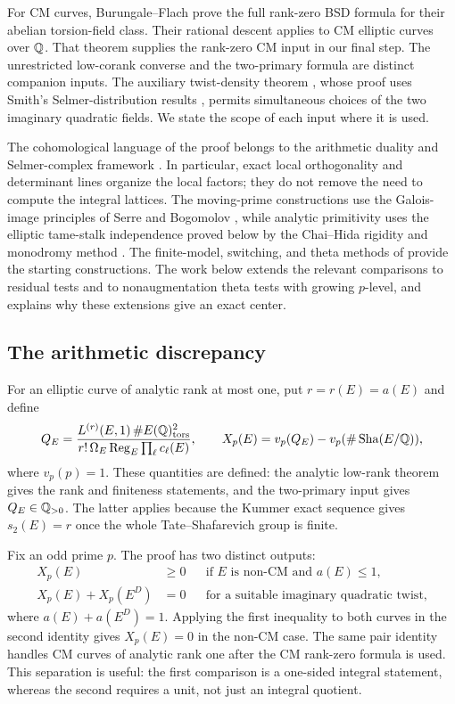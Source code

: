 For CM curves, Burungale--Flach \cite{BurungaleFlach} prove the full
rank-zero BSD formula for their abelian torsion-field class.
Their rational descent applies to CM elliptic curves over \(\mathbb Q\).
That theorem supplies the rank-zero CM input in our final step.
The unrestricted low-corank converse \cite{C} and the two-primary
formula \cite{B} are distinct companion inputs. The auxiliary
twist-density theorem \cite{Goldfeld}, whose proof uses Smith's
Selmer-distribution results \cite{Smith}, permits simultaneous
choices of the two imaginary quadratic fields. We state the
scope of each input where it is used.

The cohomological language of the proof belongs to the arithmetic
duality and Selmer-complex framework
\cite{BlochKato,Milne,Nekovar}. In particular, exact local
orthogonality and determinant lines organize the local factors;
they do not remove the need to compute the integral lattices.
The moving-prime constructions use the Galois-image principles
of Serre and Bogomolov \cite{Serre,Bogomolov}, while analytic
primitivity uses the elliptic tame-stalk independence proved below
by the Chai--Hida rigidity and monodromy method
\cite{ChaiOrd,HidaMu}. The finite-model, switching, and theta
methods of \cite{B,C} provide the starting constructions.
The work below extends the relevant comparisons to residual
tests and to nonaugmentation theta tests with growing \(p\)-level,
and explains why these extensions give an exact center.

\subsection{The arithmetic discrepancy}

For an elliptic curve of analytic rank at most one, put
$r=r(E)=a(E)$ and define
\begin{equation}\label{eq:normalized-quotient}
 Q_E=\frac{L^{(r)}(E,1)\,\#E(\mathbb Q)_{\rm tors}^{2}}
            {r!\,\Omega_E\operatorname{Reg}_E\prod_\ell c_\ell(E)},
 \qquad
 X_p(E)=v_p(Q_E)-v_p(\#\operatorname{Sha}(E/\mathbb Q)),
\end{equation}
where $v_p(p)=1$. These quantities are defined: the analytic low-rank
theorem gives the rank and finiteness statements, and the two-primary
input gives $Q_E\in\mathbb Q_{>0}$. The latter applies because the Kummer exact
sequence gives $s_2(E)=r$ once the whole Tate--Shafarevich group is
finite.

Fix an odd prime $p$. The proof has two distinct outputs:
\begin{align}
 X_p(E)&\geq0 &&\text{if $E$ is non-CM and $a(E)\leq1$},
                                      \label{eq:intro-inequality}\\
 X_p(E)+X_p(E^D)&=0 &&\text{for a suitable imaginary quadratic twist},
                                      \label{eq:intro-pair}
\end{align}
where $a(E)+a(E^D)=1$. Applying the first inequality to both curves
in the second identity gives $X_p(E)=0$ in the non-CM case. The same
pair identity handles CM curves of analytic rank one after the CM
rank-zero formula is used. This separation is useful: the first
comparison is a one-sided integral statement, whereas the second
requires a unit, not just an integral quotient.

